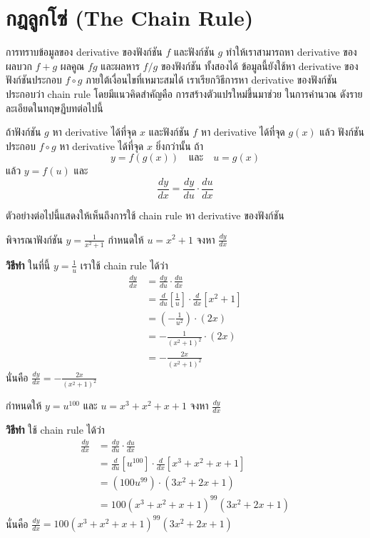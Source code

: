 \documentclass[
]{book}
\begin{document}
\section{กฎลูกโซ่ (The Chain
Rule)}\label{uxe01uxe0euxe25uxe01uxe42uxe0b-the-chain-rule}

การทราบข้อมูลของ derivative ของฟังก์ชัน \(f\) และฟังก์ชัน \(g\) ทำให้เราสามารถหา
derivative ของผลบวก \(f+g\) ผลคูณ \(fg\) และผลหาร \(f/g\) ของฟังก์ชัน
ทั้งสองได้ ข้อมูลนี้ยังใช้หา derivative ของฟังก์ชันประกอบ \(f\circ g\)
ภายใต้เงื่อนไขที่เหมาะสมได้ เราเรียกวิธีการหา derivative ของฟังก์ชัน ประกอบว่า chain
rule โดยมีแนวคิดสำคัญคือ การสร้างตัวแปรใหม่ขึ้นมาช่วย ในการคำนวณ
ดังรายละเอียดในทฤษฏีบทต่อไปนี้

ถ้าฟังก์ชัน \(g\) หา derivative ได้ที่จุด \(x\) และฟังก์ชัน \(f\) หา derivative
ได้ที่จุด \(g(x)\) แล้ว ฟังก์ชันประกอบ \(f \circ g\) หา derivative ได้ที่จุด \(x\)
ยิ่งกว่านั้น ถ้า \[y = f(g(x)) \quad \text{และ} \quad u = g(x)\] แล้ว
\(y=f(u)\) และ \[\label{E:chain1}
\boxed{
    \frac{dy}{dx} = \frac{dy}{du} \cdot \frac{du}{dx}
}\]

ตัวอย่างต่อไปนี้แสดงให้เห็นถึงการใช้ chain rule หา derivative ของฟังก์ชัน

พิจารณาฟังก์ชัน \(y = \frac{1}{x^2+1}\) กำหนดให้ \(u = x^2+1\) จงหา
\(\frac{dy}{dx}\)

\textbf{วิธีทำ} ในที่นี้ \(y = \frac{1}{u}\) เราใช้ chain rule ได้ว่า
\begin{equation}   \begin{aligned}
    \frac{dy}{dx}
    &= \frac{dy}{du} \cdot \frac{du}{dx} \\
    &= \frac{d}{du}\left[\frac{1}{u}\right] \cdot \frac{d}{dx}[x^2+1] \\
    &= \left(-\frac{1}{u^2}\right) \cdot (2x) \\
    &= -\frac{1}{(x^2+1)^2} \cdot (2x) \\
    &= -\frac{2x}{(x^2+1)^2}
  \end{aligned} \end{equation} นั่นคือ
\(\displaystyle \frac{dy}{dx} = -\frac{2x}{(x^2+1)^2}\)

กำหนดให้ \(y = u^{100}\) และ \(u = x^3 + x^2 + x + 1\) จงหา
\(\frac{dy}{dx}\)

\textbf{วิธีทำ} ใช้ chain rule ได้ว่า \begin{equation}   \begin{aligned}
    \frac{dy}{dx}
    &= \frac{dy}{du} \cdot \frac{du}{dx} \\
    &= \frac{d}{du}[u^{100}] \cdot \frac{d}{dx}[x^3+x^2+x+1] \\
    &= (100u^{99}) \cdot (3x^2+2x+1) \\
    &= 100(x^3+x^2+x+1)^{99}(3x^2+2x+1)
  \end{aligned} \end{equation} นั่นคือ
\(\displaystyle \frac{dy}{dx} = 100(x^3+x^2+x+1)^{99}(3x^2+2x+1)\)
\end{document}
